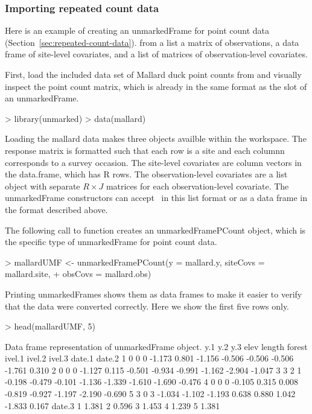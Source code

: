 \documentclass[article,shortnames]{jss}
\newcommand{\rlang}{\proglang{R}}
\newcommand{\ocovs}{\code{obsCovs}}
\begin{document}
\subsubsection{Importing repeated count data}

Here is an example of creating an unmarkedFrame for point count data
(Section~\ref{sec:repeated-count-data}).
from a list a matrix of observations, a data frame of site-level
covariates, and a list of matrices of observation-level covariates.

First, load the included data set of Mallard duck point counts from
\citet{Kery2005} and visually inspect the point count matrix, which is
already in the same format as the  slot of an unmarkedFrame.

\begin{Schunk}
\begin{Sinput}
> library(unmarked)
> data(mallard)
\end{Sinput}
\end{Schunk}

Loading the mallard data makes three objects availble within the \rlang workspace. The response matrix  is formatted such that each row is a site and each columnn corresponds to a survey occasion.  The site-level covariates are column vectors in the  data.frame, which has R rows. The observation-level covariates are a list object with separate $R \times J$ matrices for each observation-level covariate.  The unmarkedFrame constructors can accept \ocovs\ in this list format or as a data frame in the format described above.

The following call to  function creates an unmarkedFramePCount object, which is the specific type of unmarkedFrame for point count data.

\begin{Schunk}
\begin{Sinput}
> mallardUMF <- unmarkedFramePCount(y = mallard.y, siteCovs = mallard.site, 
+     obsCovs = mallard.obs)
\end{Sinput}
\end{Schunk}

Printing unmarkedFrames shows them as data frames to make it easier to verify that the data were converted correctly. Here we show the first five rows only. 

\begin{Schunk}
\begin{Sinput}
> head(mallardUMF, 5)
\end{Sinput}
\begin{Soutput}
Data frame representation of unmarkedFrame object.
  y.1 y.2 y.3   elev length forest ivel.1 ivel.2 ivel.3 date.1 date.2
1   0   0   0 -1.173  0.801 -1.156 -0.506 -0.506 -0.506 -1.761  0.310
2   0   0   0 -1.127  0.115 -0.501 -0.934 -0.991 -1.162 -2.904 -1.047
3   3   2   1 -0.198 -0.479 -0.101 -1.136 -1.339 -1.610 -1.690 -0.476
4   0   0   0 -0.105  0.315  0.008 -0.819 -0.927 -1.197 -2.190 -0.690
5   3   0   3 -1.034 -1.102 -1.193  0.638  0.880  1.042 -1.833  0.167
  date.3
1  1.381
2  0.596
3  1.453
4  1.239
5  1.381
\end{Soutput}
\end{Schunk}
\end{document}
